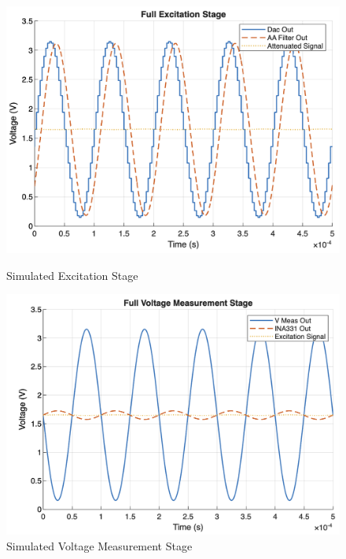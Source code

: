 \begin{figure}[H]
    \centering
    \begin{minipage}{0.48\textwidth}
        \centering
        \includegraphics[width=\textwidth]{FullExcitationStage.png}
        \caption{Simulated Excitation Stage}
        \label{fig:excitation_sim}
    \end{minipage}\hfill
    \begin{minipage}{0.48\textwidth}
        \centering
        \includegraphics[width=\textwidth]{FullVoltageMeasurementStage.png}
        \caption{Simulated Voltage Measurement Stage}
        \label{fig:voltage_meas_sim}
    \end{minipage}
\end{figure}

